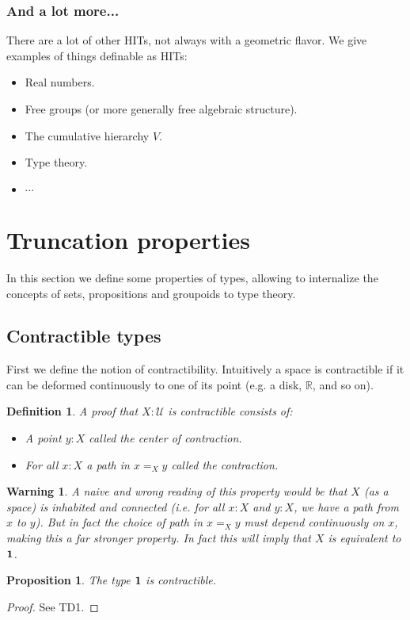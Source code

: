 \documentclass{article}
\newcommand{\se}[1]{\medbreak \medbreak \section{#1}}
\newcommand{\sse}[1]{\medbreak \subsection{#1}}
\newcommand{\ssse}[1]{\subsubsection*{#1}}
\newcommand{\U}{{\mathcal U}}
\newcommand{\one}{{\bf 1}}
\newtheorem{definition}{Definition}
\newtheorem{proposition}{Proposition}
\newtheorem{warning}{\danger Warning}
\begin{document}
\ssse{And a lot more...}

There are a lot of other HITs, not always with a geometric flavor. We give examples of things definable as HITs:
\begin{itemize} 
\item Real numbers.
\item Free groups (or more generally free algebraic structure).
\item The cumulative hierarchy $V$.
\item Type theory.
\item $\cdots$
\end{itemize}




\se{Truncation properties}

In this section we define some properties of types, allowing to internalize the concepts of sets, propositions and groupoids to type theory.


\sse{Contractible types}

First we define the notion of contractibility. Intuitively a space is contractible if it can be deformed continuously to one of its point (e.g. a disk, $\mathbb{R}$, and so on). %

\begin{definition}
A proof that $X:\U$ is contractible consists of:
\begin{itemize}
\item A point $y:X$ called the \emph{center of contraction}.
\item For all $x:X$ a path in $x=_X y$ called the \emph{contraction}.
\end{itemize}
\end{definition}

\begin{warning}
A naive and wrong reading of this property would be that $X$ (as a space) is inhabited and connected (i.e. for all $x:X$ and $y:X$, we have a path from $x$ to $y$). But in fact the choice of path in $x=_X y$ must depend continuously on $x$, making this a far stronger property. In fact this will imply that $X$ is equivalent to $\one$.
\end{warning}

\begin{proposition}
The type $\one$ is contractible.
\end{proposition}
\begin{proof}
See TD1.
\end{proof}
\end{document}
